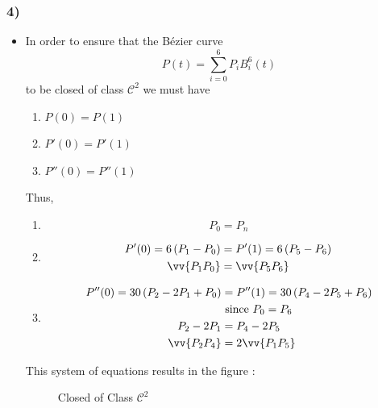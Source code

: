 \subsubsection{4)}
\begin{itemize}
  \item In order to ensure that the Bézier curve 
      \[
          P(t) = \sum_{i=0}^{6} P_iB _{ i }^{ 6 } (t) 
      \]
      to be closed of class $ \mathscr{ C } ^2 $ we must have 
      \begin{enumerate}
          \item $P(0) = P(1)$ 
          \item $ P'(0) = P'(1) $
          \item $ P''(0) = P''(1) $
      \end{enumerate}
      Thus, 
      \begin{enumerate}
          \item \[ P_0 = P_n \]
          \item 
              \begin{align*}
                  P'(0) = 6\left( P_1 - P_0\right) &= P'(1) = 6\left( P_5 - P_6\right) \\
                  \vv{P_1P_0} &= \vv{P_5P_6} 
              \end{align*}
          \item 
              \begin{align*}
                  P''(0) = 30\left( P_2 - 2P_1 + P_0\right) &= P''(1) = 30\left( P_4 - 2P_5
                  + P_6\right) \\
                   &\text{ since } P_0 = P_6 \\ 
                  P_2 - 2P_1 &= P_4 - 2P_5 \\
                  \vv{P_2P_4} &= 2\vv{P_1P_5} \\ 
              \end{align*}
      \end{enumerate}
        This system of equations results in the figure : 
\begin{figure}[ht]
    \centering
    \caption{Closed of Class $ \mathscr{ C } ^2 $}
    \label{fig:t2e4}
\end{figure}
\end{itemize}

